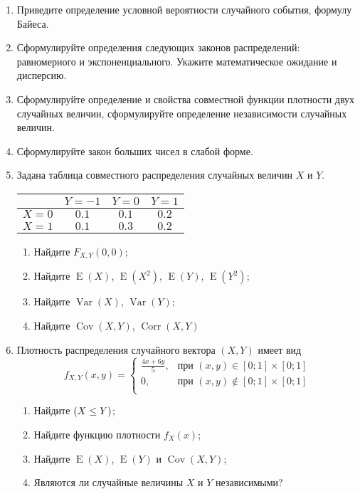 \documentclass[11pt]{article} %
\DeclareMathOperator{\Cov}{Cov}
\DeclareMathOperator{\Corr}{Corr}
\DeclareMathOperator{\Var}{Var}
\DeclareMathOperator{\E}{E}
\let\P\relax
\DeclareMathOperator{\P}{\mathbb{P}}
\begin{document}
\begin{enumerate}
\item Приведите определение условной вероятности случайного события, формулу Байеса.
\item Сформулируйте определения следующих законов распределений: равномерного и экспоненциального. Укажите математическое ожидание и дисперсию.
\item	Сформулируйте определение и свойства совместной функции плотности двух случайных величин, сформулируйте определение независимости случайных величин.
\item Сформулируйте закон больших чисел в слабой форме.

\item Задана таблица совместного распределения случайных величин $X$ и $Y$.
\begin{center}
\begin{tabular}{lccc}
\toprule
                       & $Y=-1$  & $Y=0$   & $Y=1$   \\ 
 \midrule
$X=0$                 & $0.1$ & $0.1$ & $0.2$ \\
 $X=1$                 & $0.1$ & $0.3$ & $0.2$ \\ 
 \bottomrule
\end{tabular}
\end{center}


\begin{enumerate}
    \item Найдите $F_{X,Y}(0, 0)$;
    \item Найдите $\E(X)$, $\E(X^2)$, $\E(Y)$, $\E(Y^2)$;
    \item Найдите $\Var(X)$, $\Var(Y)$;
    \item Найдите $\Cov(X, Y)$, $\Corr(X, Y)$
\end{enumerate}    
\item Плотность распределения случайного вектора $(X,Y)$ имеет вид
\[
f_{X,Y}(x,y) = 
\begin{cases} 
\frac{4x+6y}{5}, & \text{при } (x,y) \in [0;1] \times [0;1] \\ 
0 , & \text{при } (x,y) \not\in [0;1] \times [0;1] \\
\end{cases}
\]

\begin{enumerate}
\item Найдите $\P(X \leq Y)$;
\item Найдите функцию плотности $f_X(x)$;
\item Найдите $\E(X)$, $\E(Y)$ и $\Cov(X, Y)$;
\item Являются ли случайные величины $X$ и $Y$ независимыми?
\end{enumerate} 


\end{enumerate}
\end{document}
